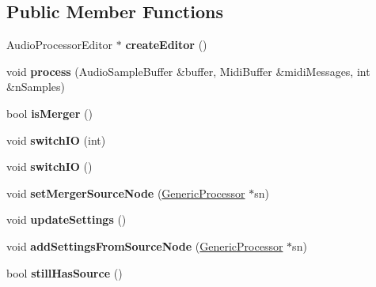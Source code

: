 \subsection*{Public Member Functions}
\begin{DoxyCompactItemize}
\item 
\hypertarget{classMerger_a2e381efbef8d22df3b6522bb04325ced}{Audio\-Processor\-Editor $\ast$ {\bfseries create\-Editor} ()}\label{classMerger_a2e381efbef8d22df3b6522bb04325ced}

\item 
\hypertarget{classMerger_aa486022781477e2602efa1edac73d69a}{void {\bfseries process} (Audio\-Sample\-Buffer \&buffer, Midi\-Buffer \&midi\-Messages, int \&n\-Samples)}\label{classMerger_aa486022781477e2602efa1edac73d69a}

\item 
\hypertarget{classMerger_aff9f501ad9eb8bf1cd85570860cbc24c}{bool {\bfseries is\-Merger} ()}\label{classMerger_aff9f501ad9eb8bf1cd85570860cbc24c}

\item 
\hypertarget{classMerger_a7175efb6c9552ca22f9f902417232f06}{void {\bfseries switch\-I\-O} (int)}\label{classMerger_a7175efb6c9552ca22f9f902417232f06}

\item 
\hypertarget{classMerger_a23a05860a3235e426fbd4af0c149ea58}{void {\bfseries switch\-I\-O} ()}\label{classMerger_a23a05860a3235e426fbd4af0c149ea58}

\item 
\hypertarget{classMerger_a2017343133663806fea51c9a03688628}{void {\bfseries set\-Merger\-Source\-Node} (\hyperlink{classGenericProcessor}{Generic\-Processor} $\ast$sn)}\label{classMerger_a2017343133663806fea51c9a03688628}

\item 
\hypertarget{classMerger_a6e5a8168ded7f0e5e3005391b0484f4e}{void {\bfseries update\-Settings} ()}\label{classMerger_a6e5a8168ded7f0e5e3005391b0484f4e}

\item 
\hypertarget{classMerger_ac02eb852bd934fde14c15579e2dd94fb}{void {\bfseries add\-Settings\-From\-Source\-Node} (\hyperlink{classGenericProcessor}{Generic\-Processor} $\ast$sn)}\label{classMerger_ac02eb852bd934fde14c15579e2dd94fb}

\item 
\hypertarget{classMerger_a428d5a8805969e1b14169c1a916f4a90}{bool {\bfseries still\-Has\-Source} ()}\label{classMerger_a428d5a8805969e1b14169c1a916f4a90}

\end{DoxyCompactItemize}
